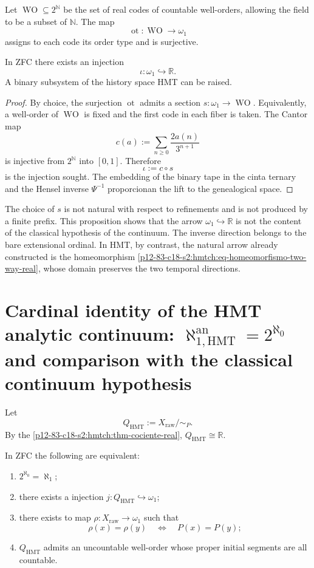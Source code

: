 Let \(\operatorname{WO}\subseteq2^{\mathbb N}\) be the set of real
codes of countable well-orders, allowing the field to be a
subset of \(\mathbb N\). The map
\[
 \operatorname{ot}:\operatorname{WO}\longrightarrow\omega_1
\]
assigns to each code its order type and is surjective.

\begin{proposition}
\label{p12-83-c19-s1:hmtch:prop-omega1-en-reales}
In ZFC there exists an injection
\[
 \iota:\omega_1\hookrightarrow\mathbb R.
\]
A binary subsystem of the history space HMT can be raised.
\end{proposition}

\begin{proof}
By choice, the surjection \(\operatorname{ot}\) admits a section
\(s:\omega_1\to\operatorname{WO}\). Equivalently, a well-order
of \(\operatorname{WO}\) is fixed and the first code in each fiber is taken.
The Cantor map
\[
 c(a):=\sum_{n\geq0}\frac{2a(n)}{3^{n+1}}
\]
is injective from \(2^{\mathbb N}\) into \([0,1]\). Therefore
\[
 \iota:=c\circ s
\]
is the injection sought. The embedding of the binary tape in the cinta
ternary and the Hensel inverse \(\Psi^{-1}\) proporcionan the lift to the
genealogical space.
\end{proof}

The choice of \(s\) is not natural with respect to refinements and is not
produced by a finite prefix. This proposition shows that the arrow
\(\omega_1\hookrightarrow\mathbb R\) is not the content of the classical
hypothesis of the continuum. The inverse direction belongs to the bare extensional
ordinal. In HMT, by contrast, the natural arrow already constructed is the
homeomorphism \eqref{p12-83-c18-s2:hmtch:eq-homeomorfismo-two-way-real}, whose domain
preserves the two temporal directions.

\section{Cardinal identity of the HMT analytic continuum: \(\aleph_{1,\mathrm{HMT}}^{\mathrm{an}}=2^{\aleph_0}\) and comparison with the classical continuum hypothesis}

Let
\[
 Q_{\mathrm{HMT}}:=X_{\mathrm{raw}}/\!\sim_P.
\]
By the \cref{p12-83-c18-s2:hmtch:thm-cociente-real},
\(Q_{\mathrm{HMT}}\cong\mathbb R\).

\begin{theorem}
\label{p12-83-c19-s1:hmtch:thm-equivalencias-ch}
In ZFC the following are equivalent:
\begin{enumerate}
 \item \(2^{\aleph_0}=\aleph_1\);
 \item there exists a injection \(j:Q_{\mathrm{HMT}}\hookrightarrow\omega_1\);
 \item there exists to map \(\rho:X_{\mathrm{raw}}\to\omega_1\) such that
 \[
  \rho(x)=\rho(y)
  \quad\Longleftrightarrow\quad
  P(x)=P(y);
 \]
 \item \(Q_{\mathrm{HMT}}\) admits an uncountable well-order whose proper
 initial segments are all countable.
\end{enumerate}
\end{theorem}

